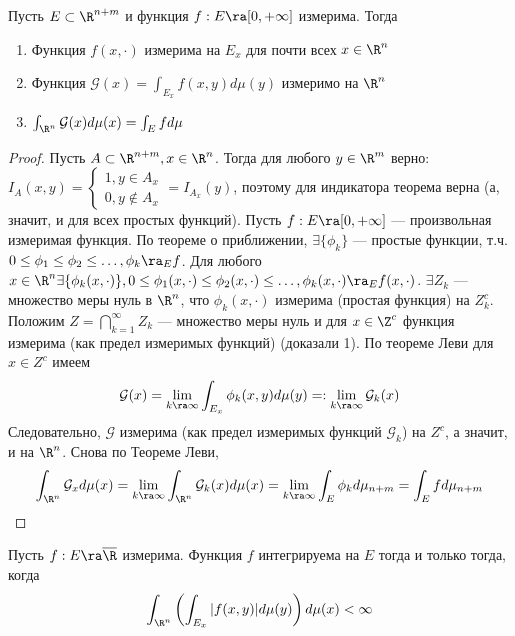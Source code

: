 \begin{theorem}[Тонелли]
    Пусть \(E \subset \R^{n + m}\) и функция \(f: E \ra [0, +\infty]\) измерима. Тогда
    \begin{enumerate}
        \item Функция \(f(x, \cdot)\) измерима на \(E_x\) для почти всех \(x \in \R^n\)
        \item Функция \(\mathcal{G}(x) = \int_{E_x}f(x, y)d\mu(y)\) измеримо на \(\R^n\)
        \item \(\int_{\R^n}\mathcal{G}(x)d\mu(x) = \int_E f d \mu\)
    \end{enumerate}
\end{theorem}
\begin{proof}
    Пусть \(A \subset \R^{n + m}, x \in \R^n\). Тогда для любого \(y \in \R^m\) верно: \(I_A(x, y) = \left\{\begin{array}{ll}
        1, y \in A_x \\ 
        0, y \notin A_x
    \end{array}\right. = I_{A_x}(y)\), поэтому для индикатора теорема верна (а, значит, и для всех простых функций).
    Пусть \(f: E \ra [0, +\infty]\) --- произвольная измеримая функция. По теореме о приближении, \(\exists \{\phi_k\}\) --- простые функции, т.ч. \(0\le \phi_1 \le \phi_2 \le \dots, \phi_k \ra_E f\). Для любого \(x \in \R^n \exists \{\phi_k(x, \cdot)\}, 0 \le \phi_1(x, \cdot) \le \phi_2(x, \cdot) \le \dots, \phi_k(x, \cdot) \ra_E f(x, \cdot)\). \(\exists Z_k\) --- множество меры нуль в \(\R^n\), что \(\phi_k(x, \cdot)\) измерима (простая функция) на \(Z_k^c\). Положим \(Z = \bigcap_{k = 1}^\infty Z_k\) --- множество меры нуль и для \(x \in \Z^c\) функция измерима (как предел измеримых функций) (доказали 1). По теореме Леви для \(x \in Z^c\) имеем
    \[\mathcal{G}(x) = \lim_{k \ra \infty} \int_{E_x}\phi_k(x, y)d\mu(y) =: \lim_{k \ra \infty} \mathcal{G}_k(x)\]
    Следовательно, \(\mathcal{G}\) измерима (как предел измеримых функций \(\mathcal{G}_k\)) на \(Z^c\), а значит, и на \(\R^n\). Снова по Теореме Леви,
    \[\int_{\R^n}\mathcal{G}_xd\mu(x) = \lim_{k \ra \infty} \int_{\R^n} \mathcal{G}_k(x)d\mu(x) = \lim_{k \ra \infty} \int_E \phi_kd\mu_{n + m} = \int_E f d \mu_{n + m}\]
\end{proof}

\begin{corollary}
    Пусть \(f: E \ra \overline{\R}\) измерима. Функция \(f\) интегрируема на \(E\) тогда и только тогда, когда 
    \[\int_{\R^n}\left(\int_{E_x}|f(x, y)|d\mu(y)\right)d\mu(x) < \infty\]
\end{corollary}

